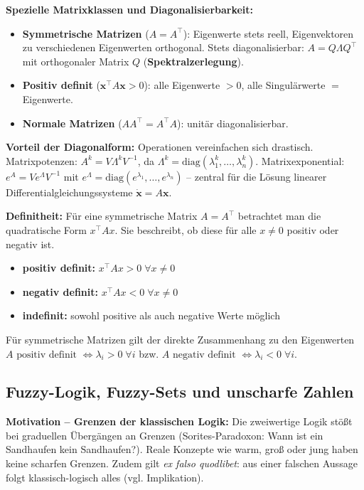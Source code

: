 \textbf{Spezielle Matrixklassen und Diagonalisierbarkeit:}
\begin{itemize}[leftmargin=1.5em]
    \item \textbf{Symmetrische Matrizen} ($A = A^\top$): Eigenwerte stets reell, Eigenvektoren zu verschiedenen Eigenwerten orthogonal. Stets diagonalisierbar: $A = Q \Lambda Q^\top$ mit orthogonaler Matrix $Q$ (\textbf{Spektralzerlegung}).
    \item \textbf{Positiv definit} ($\bm{x}^\top A \bm{x} > 0$): alle Eigenwerte $> 0$, alle Singulärwerte $= $ Eigenwerte.
    \item \textbf{Normale Matrizen} ($AA^\top = A^\top A$): unitär diagonalisierbar.
\end{itemize}

\textbf{Vorteil der Diagonalform:} Operationen vereinfachen sich drastisch. Matrixpotenzen: $A^k = V\Lambda^k V^{-1}$, da $\Lambda^k = \mathrm{diag}(\lambda_1^k,\ldots,\lambda_n^k)$. Matrixexponential: $e^A = Ve^{\Lambda}V^{-1}$ mit $e^{\Lambda} = \mathrm{diag}(e^{\lambda_1},\ldots,e^{\lambda_n})$ -- zentral für die Lösung linearer Differentialgleichungssysteme $\dot{\bm{x}} = A\bm{x}$.

\textbf{Definitheit:} Für eine symmetrische Matrix $A = A^\top$ betrachtet man die quadratische Form $x^\top A x$. Sie beschreibt, ob diese für alle $x \neq 0$ positiv oder negativ ist.

\begin{itemize}[leftmargin=1.5em]
    \item \textbf{positiv definit:} $x^\top A x > 0 \;\forall x \neq 0$
    \item \textbf{negativ definit:} $x^\top A x < 0 \;\forall x \neq 0$
    \item \textbf{indefinit:} sowohl positive als auch negative Werte möglich
\end{itemize}

Für symmetrische Matrizen gilt der direkte Zusammenhang zu den Eigenwerten $A \text{ positiv definit } \iff \lambda_i > 0 \;\forall i$ bzw. $A \text{ negativ definit } \iff \lambda_i < 0 \;\forall i$.

\newpage

\subsection{Fuzzy-Logik, Fuzzy-Sets und unscharfe Zahlen}

\textbf{Motivation -- Grenzen der klassischen Logik:} Die zweiwertige Logik stößt bei graduellen Übergängen an Grenzen (Sorites-Paradoxon: Wann ist ein Sandhaufen kein Sandhaufen?). Reale Konzepte wie warm, groß oder jung haben keine scharfen Grenzen. Zudem gilt \emph{ex falso quodlibet}: aus einer falschen Aussage folgt klassisch-logisch alles (vgl. Implikation).

